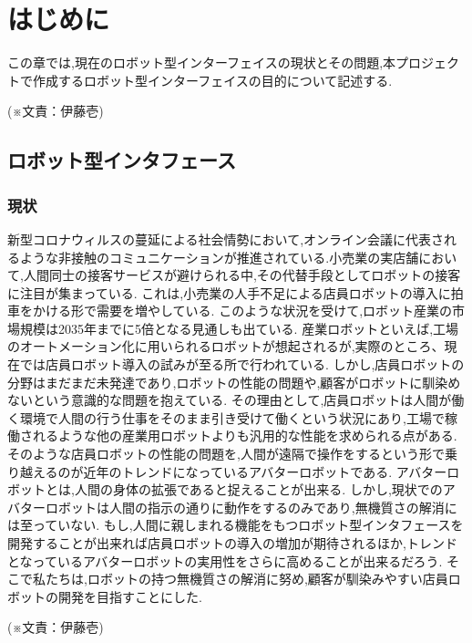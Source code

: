 \chapter{はじめに} 
%
この章では,現在のロボット型インターフェイスの現状とその問題,本プロジェクトで作成するロボット型インターフェイスの目的について記述する.
\begin{flushright}
(※文責：伊藤壱)
\end{flushright}
\section{ロボット型インタフェース}
\subsection{現状}
%
%
新型コロナウィルスの蔓延による社会情勢において,オンライン会議に代表されるような非接触のコミュニケーションが推進されている.小売業の実店舗において,人間同士の接客サービスが避けられる中,その代替手段としてロボットの接客に注目が集まっている.
これは,小売業の人手不足による店員ロボットの導入に拍車をかける形で需要を増やしている.
このような状況を受けて,ロボット産業の市場規模は2035年までに5倍となる見通しも出ている.
産業ロボットといえば,工場のオートメーション化に用いられるロボットが想起されるが,実際のところ、現在では店員ロボット導入の試みが至る所で行われている.
しかし,店員ロボットの分野はまだまだ未発達であり,ロボットの性能の問題や,顧客がロボットに馴染めないという意識的な問題を抱えている.
その理由として,店員ロボットは人間が働く環境で人間の行う仕事をそのまま引き受けて働くという状況にあり,工場で稼働されるような他の産業用ロボットよりも汎用的な性能を求められる点がある.
そのような店員ロボットの性能の問題を,人間が遠隔で操作をするという形で乗り越えるのが近年のトレンドになっているアバターロボットである.
アバターロボットとは,人間の身体の拡張であると捉えることが出来る.
しかし,現状でのアバターロボットは人間の指示の通りに動作をするのみであり,無機質さの解消には至っていない.
もし,人間に親しまれる機能をもつロボット型インタフェースを開発することが出来れば店員ロボットの導入の増加が期待されるほか,トレンドとなっているアバターロボットの実用性をさらに高めることが出来るだろう.
そこで私たちは,ロボットの持つ無機質さの解消に努め,顧客が馴染みやすい店員ロボットの開発を目指すことにした.
\begin{flushright}
(※文責：伊藤壱)
\end{flushright}

